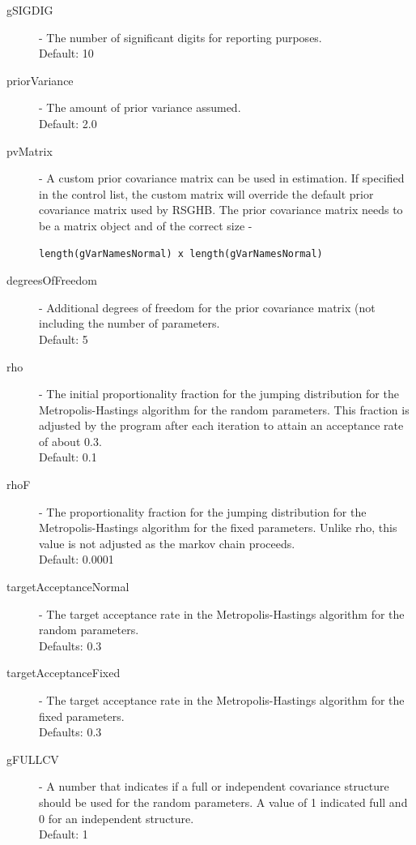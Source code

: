 \documentclass{article}\usepackage[]{graphicx}\usepackage[]{color}
\begin{document}
\begin{description}
\item[gSIGDIG] - The number of significant digits for reporting purposes.\\ 
Default: 10

\item[priorVariance] - The amount of prior variance assumed.\\ 
Default: 2.0

\item[pvMatrix] - A custom prior covariance matrix can be used in estimation. If specified in the control list, the custom matrix will override the default prior covariance matrix used by RSGHB. The prior covariance matrix needs to be a matrix object and of the correct size - \begin{verbatim}length(gVarNamesNormal) x length(gVarNamesNormal)\end{verbatim}  

\item[degreesOfFreedom] - Additional degrees of freedom for the prior covariance matrix (not including the number of parameters.\\ 
Default: 5

\item[rho] - The initial proportionality fraction for the jumping distribution for the Metropolis-Hastings algorithm for the random parameters. This fraction is adjusted by the program after each iteration to attain an acceptance rate of about 0.3.\\ 
Default: 0.1

\item[rhoF] - The proportionality fraction for the jumping distribution for the Metropolis-Hastings algorithm for the fixed parameters. Unlike rho, this value is not adjusted as the markov chain proceeds. \\
Default: 0.0001

\item[targetAcceptanceNormal] - The target acceptance rate in the Metropolis-Hastings algorithm for the random parameters. \\
Defaults: 0.3

\item[targetAcceptanceFixed] - The target acceptance rate in the Metropolis-Hastings algorithm for the fixed parameters. \\
Defaults: 0.3

\item[gFULLCV] - A number that indicates if a full or independent covariance structure should be used for the random parameters. A value of 1 indicated full and 0 for an independent structure.\\ Default: 1


\end{description}
\end{document}
